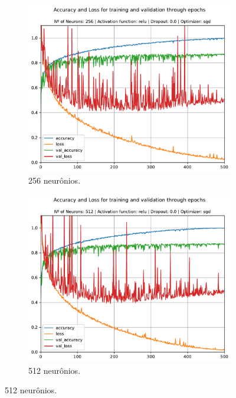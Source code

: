 \begin{figure}[H]
	\centering
	\begin{subfigure}[H]{0.49\textwidth}
		\includegraphics[width = \textwidth]{../../plot/mlp/mlp_256_relu_0.0_sgd}
		\caption{256 neurônios.}
		\label{fig:mlp_256_relu_0.0_sgd}
	\end{subfigure}
	\begin{subfigure}[H]{0.49\textwidth}
		\centering
		\includegraphics[width = \textwidth]{../../plot/mlp/mlp_512_relu_0.0_sgd}
		\caption{512 neurônios.}
		\label{fig:mlp_512_relu_0.0_sgd}

\end{subfigure}
\end{figure}
